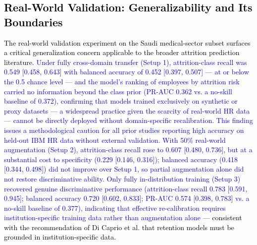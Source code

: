 \documentclass[a4paper,fleqn]{cas-sc}
\begin{document}
\subsection{\textcolor{black}{Real-World Validation: Generalizability and Its Boundaries}}
\textcolor{black}{The real-world validation experiment on the Saudi medical-sector subset \cite{alqahtani2025saudi} surfaces a critical generalization concern applicable to the broader attrition prediction literature. \textcolor{blue}{Under fully cross-domain transfer (Setup 1), attrition-class recall was 0.549 [0.458, 0.643] with balanced accuracy of 0.452 [0.397, 0.507] — at or below the 0.5 chance level — and the model's ranking of employees by attrition risk carried no information beyond the class prior (PR-AUC 0.362 vs. a no-skill baseline of 0.372), confirming that models trained exclusively on synthetic or proxy datasets — a widespread practice given the scarcity of real-world HR data — cannot be directly deployed without domain-specific recalibration. This finding issues a methodological caution for all prior studies reporting high accuracy on held-out IBM HR data without external validation. With 50\% real-world augmentation (Setup 2), attrition-class recall rose to 0.607 [0.480, 0.736], but at a substantial cost to specificity (0.229 [0.146, 0.316]); balanced accuracy (0.418 [0.344, 0.498]) did not improve over Setup 1, so partial augmentation alone did not restore discriminative ability. Only fully in-distribution training (Setup 3) recovered genuine discriminative performance (attrition-class recall 0.783 [0.591, 0.945]; balanced accuracy 0.720 [0.602, 0.833]; PR-AUC 0.574 [0.398, 0.783] vs. a no-skill baseline of 0.377), indicating that effective re-calibration requires institution-specific training data rather than augmentation alone} — consistent with the recommendation of Di Caprio et al. \cite{DICAPRIO2025100403} that retention models must be grounded in institution-specific data.}
\end{document}
